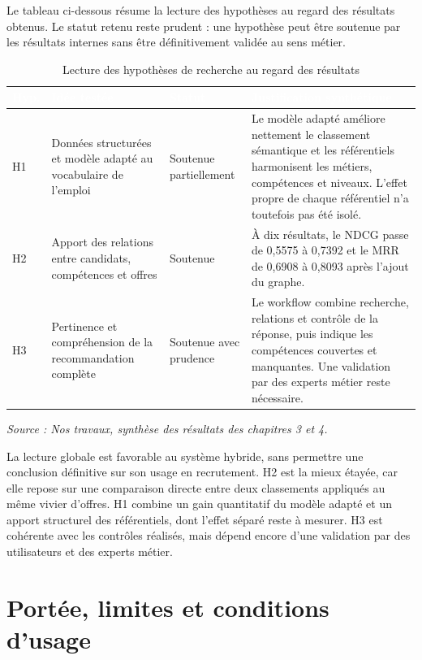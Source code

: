 \documentclass[12pt,twoside]{report}
\newcommand{\source}[1]{%
  \par\vspace{0.2\baselineskip}
  {\centering\footnotesize\itshape Source : #1\par}
}
\newcommand{\tabheader}[1]{\textcolor{white}{\textbf{#1}}}
\newcommand{\tableStyleStart}{%
  \small
  \renewcommand{\arraystretch}{1.12}%
  \setlength{\tabcolsep}{4pt}%
  \rowcolors{2}{lightblue!12}{white}%
}
\newcommand{\tableStyleEnd}{%
  \rowcolors{2}{}{}%
  \renewcommand{\arraystretch}{1}%
}
\begin{document}
Le tableau ci-dessous résume la lecture des hypothèses au regard des résultats obtenus. Le statut retenu reste prudent : une hypothèse peut être soutenue par les résultats internes sans être définitivement validée au sens métier.

\begin{table}[H]
\centering
\caption{Lecture des hypothèses de recherche au regard des résultats}
\label{tab:synthese_hypotheses}
\tableStyleStart
\begin{tabularx}{\textwidth}{p{1.2cm}p{4.9cm}p{3.1cm}X}
\rowcolor{darkblue}
\tabheader{Hyp.} & \tabheader{Idée testée} & \tabheader{Statut} & \tabheader{Justification synthétique} \\
\midrule
H1 & Données structurées et modèle adapté au vocabulaire de l'emploi & Soutenue partiellement & Le modèle adapté améliore nettement le classement sémantique et les référentiels harmonisent les métiers, compétences et niveaux. L'effet propre de chaque référentiel n'a toutefois pas été isolé. \\
H2 & Apport des relations entre candidats, compétences et offres & Soutenue & À dix résultats, le NDCG passe de 0,5575 à 0,7392 et le MRR de 0,6908 à 0,8093 après l'ajout du graphe. \\
H3 & Pertinence et compréhension de la recommandation complète & Soutenue avec prudence & Le workflow combine recherche, relations et contrôle de la réponse, puis indique les compétences couvertes et manquantes. Une validation par des experts métier reste nécessaire. \\
\bottomrule
\end{tabularx}
\tableStyleEnd
\source{Nos travaux, synthèse des résultats des chapitres 3 et 4.}
\end{table}

La lecture globale est favorable au système hybride, sans permettre une conclusion définitive sur son usage en recrutement. H2 est la mieux étayée, car elle repose sur une comparaison directe entre deux classements appliqués au même vivier d'offres. H1 combine un gain quantitatif du modèle adapté et un apport structurel des référentiels, dont l'effet séparé reste à mesurer. H3 est cohérente avec les contrôles réalisés, mais dépend encore d'une validation par des utilisateurs et des experts métier.

\section{Portée, limites et conditions d'usage}
\end{document}
